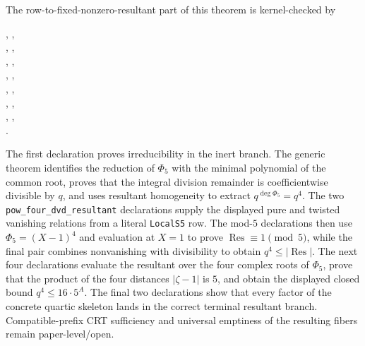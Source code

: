 \documentclass[11pt]{amsart}
\theoremstyle{definition}
\theoremstyle{remark}
\begin{document}
The row-to-fixed-nonzero-resultant part of this theorem is kernel-checked by
\begin{center}
\small
{},\qquad
{},\\
,\quad
{},\\
,\quad
{},\\
,\quad
{},\\
,\quad
{},\\
,\quad
{},\\
,\quad
{},\\
.
\end{center}
The first declaration proves irreducibility in the inert branch.  The
generic theorem identifies the reduction of \(\Phi_5\) with the minimal
polynomial of the common root, proves that the integral division remainder
is coefficientwise divisible by \(q\), and uses resultant homogeneity to
extract \(q^{\deg\Phi_5}=q^4\).  The two
\texttt{pow\_four\_dvd\_resultant} declarations supply the displayed pure
and twisted vanishing relations from a literal
\texttt{LocalS5} row.  The mod-\(5\) declarations then use
\(\Phi_5=(X-1)^4\) and evaluation at \(X=1\) to prove
\(\operatorname{Res}\equiv1\pmod5\), while the final pair combines
nonvanishing with divisibility to obtain
\(q^4\le|\operatorname{Res}|\).  The next four declarations evaluate the
resultant over the four complex roots of \(\Phi_5\), prove that the product
of the four distances \(|\zeta-1|\) is \(5\), and obtain the displayed
closed bound \(q^4\le16\cdot5^A\).  The final two declarations show that
every factor of the concrete quartic skeleton lands in the correct terminal
resultant branch.  Compatible-prefix CRT sufficiency and universal
emptiness of the resulting fibers remain paper-level/open.
\end{document}
